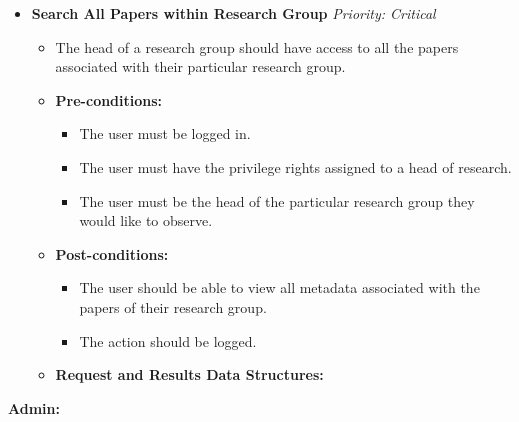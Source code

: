 \documentclass{article}
\begin{document}
				\begin{itemize}
					\item \textbf{Search All Papers within Research Group} \hfill \textit{Priority: Critical}
					\begin{itemize}
						\item The head of a research group should have access to all the papers associated with their particular research group.
						\item \textbf{Pre-conditions:}
						\begin{itemize}
							\item The user must be logged in.
							\item The user must have the privilege rights assigned to a head of research.
							\item The user must be the head of the particular research group they would like to observe.
						\end{itemize}
						\item \textbf{Post-conditions:}
						\begin{itemize}
							\item The user should be able to view all metadata associated with the papers of their research group.
							\item The action should be logged.
						\end{itemize}
						\item \textbf{Request and Results Data Structures:}
					\end{itemize}
				\end{itemize}
				\textbf{Admin:}
				
\end{document}
